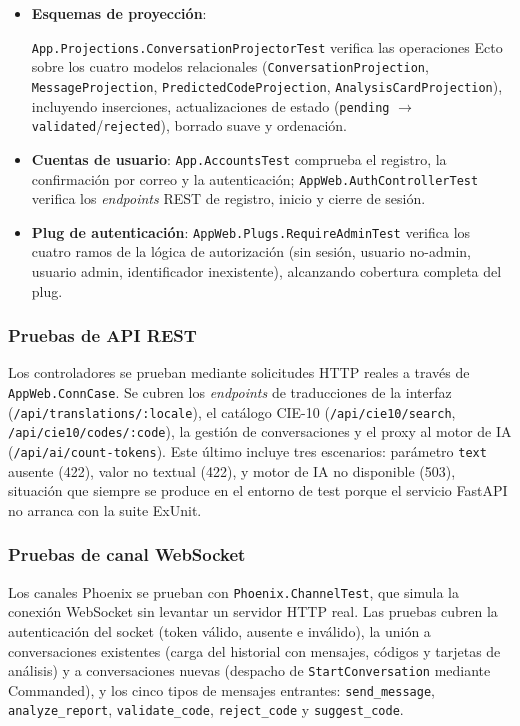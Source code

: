 \begin{itemize}
 \item \textbf{Esquemas de proyección}: \begin{sloppypar}\texttt{App.Projections.ConversationProjectorTest} verifica las operaciones Ecto sobre los cuatro modelos relacionales (\texttt{ConversationProjection}, \texttt{MessageProjection}, \texttt{PredictedCodeProjection}, \texttt{Analys\-isCardProjection}), incluyendo inserciones, actualizaciones de estado (\texttt{pending} $\to$ \texttt{validated}/\texttt{rejected}), borrado suave y ordenación.\end{sloppypar}
 \item \textbf{Cuentas de usuario}: \texttt{App.AccountsTest} comprueba el registro, la confirmación por correo y la autenticación; \texttt{AppWeb.AuthControllerTest} verifica los \emph{endpoints} REST de registro, inicio y cierre de sesión.
 \item \textbf{Plug de autenticación}: \texttt{AppWeb.Plugs.RequireAdminTest} verifica los cuatro ramos de la lógica de autorización (sin sesión, usuario no-admin, usuario admin, identificador inexistente), alcanzando cobertura completa del plug.
\end{itemize}

\subsubsection*{Pruebas de API REST}

Los controladores se prueban mediante solicitudes HTTP reales a través de \texttt{AppWeb.ConnCase}. Se cubren los \emph{endpoints} de traducciones de la interfaz (\texttt{/api/translations/:locale}), el catálogo CIE-10 (\texttt{/api/cie10/search}, \texttt{/api/cie10/codes/:code}), la gestión de conversaciones y el proxy al motor de IA (\texttt{/api/ai/count-tokens}). Este último incluye tres escenarios: parámetro \texttt{text} ausente (422), valor no textual (422), y motor de IA no disponible (503), situación que siempre se produce en el entorno de test porque el servicio FastAPI no arranca con la suite ExUnit.

\subsubsection*{Pruebas de canal WebSocket}

Los canales Phoenix se prueban con \texttt{Phoenix.ChannelTest}, que simula la conexión WebSocket sin levantar un servidor HTTP real. Las pruebas cubren la autenticación del socket (token válido, ausente e inválido), la unión a conversaciones existentes (carga del historial con mensajes, códigos y tarjetas de análisis) y a conversaciones nuevas (despacho de \texttt{StartConversation} mediante Commanded), y los cinco tipos de mensajes entrantes: \texttt{send\_message}, \texttt{analyze\_report}, \texttt{validate\_code}, \texttt{reject\_code} y \texttt{suggest\_code}.

